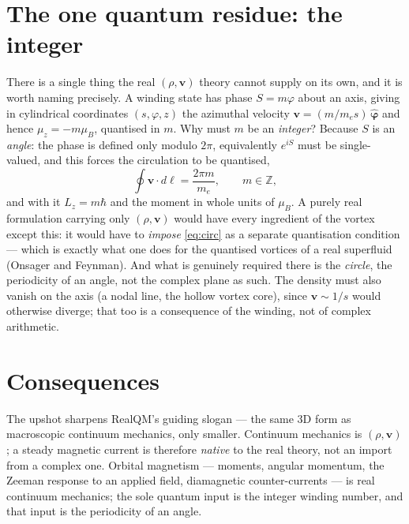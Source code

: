 \documentclass[11pt]{article}
\begin{document}
\section{The one quantum residue: the integer}

There is a single thing the real $(\rho,\mathbf v)$ theory cannot supply on its own, and it is worth naming
precisely. A winding state has phase $S=m\varphi$ about an axis, giving in cylindrical coordinates
$(s,\varphi,z)$ the azimuthal velocity $\mathbf v=(m/m_e s)\,\hat{\boldsymbol\varphi}$ and hence
$\mu_z=-m\mu_B$, quantised in $m$. Why must $m$ be an \emph{integer}? Because $S$ is an \emph{angle}: the phase
is defined only modulo $2\pi$, equivalently $e^{iS}$ must be single-valued, and this forces the circulation to
be quantised,
\begin{equation}
\oint \mathbf v\cdot d\boldsymbol\ell=\frac{2\pi m}{m_e},\qquad m\in\mathbb Z ,
\label{eq:circ}
\end{equation}
and with it $L_z=m\hbar$ and the moment in whole units of $\mu_B$. A purely real formulation carrying only
$(\rho,\mathbf v)$ would have every ingredient of the vortex except this: it would have to \emph{impose}
\eqref{eq:circ} as a separate quantisation condition --- which is exactly what one does for the quantised
vortices of a real superfluid (Onsager and Feynman). And what is genuinely required there is the
\emph{circle}, the periodicity of an angle, not the complex plane as such. The density must also vanish on the
axis (a nodal line, the hollow vortex core), since $\mathbf v\sim 1/s$ would otherwise diverge; that too is a
consequence of the winding, not of complex arithmetic.

\section{Consequences}

The upshot sharpens RealQM's guiding slogan --- the same 3D form as macroscopic continuum mechanics, only
smaller. Continuum mechanics is $(\rho,\mathbf v)$; a steady magnetic current is therefore \emph{native} to the
real theory, not an import from a complex one. Orbital magnetism --- moments, angular momentum, the Zeeman
response to an applied field, diamagnetic counter-currents --- is real continuum mechanics; the sole quantum
input is the integer winding number, and that input is the periodicity of an angle.
\end{document}
